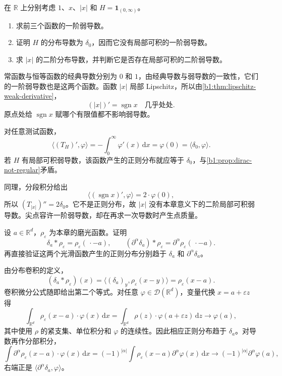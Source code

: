 \begin{exercise}\label{b1:ex:20-basic-weak-derivatives}
在 \(\mathbb R\) 上分别考虑 \(1\)、\(x\)、\(|x|\) 和 \(H=\mathbf1_{(0,\infty)}\)。
\begin{enumerate}
\item 求前三个函数的一阶弱导数。
\item 证明 \(H\) 的分布导数为 \(\delta_0\)，因而它没有局部可积的一阶弱导数。
\item 求 \(|x|\) 的二阶分布导数，并判断它是否存在局部可积的二阶弱导数。
\end{enumerate}
\end{exercise}
\begin{solution}
常函数与恒等函数的经典导数分别为 \(0\) 和 \(1\)，由经典导数与弱导数的一致性，它们的一阶弱导数也是这两个函数。函数 \(|x|\) 局部 Lipschitz，所以由\cref{b1:thm:lipschitz-weak-derivative}，
\[
 (|x|)'=\operatorname{sgn}x
 \quad\text{几乎处处}.
\]
原点处给 \(\operatorname{sgn}x\) 赋哪个有限值都不影响弱导数。

对任意测试函数，
\[
 \langle(T_H)',\varphi\rangle
 =-\int_0^\infty\varphi'(x)\,\mathrm dx
 =\varphi(0)=\langle\delta_0,\varphi\rangle.
\]
若 \(H\) 有局部可积弱导数，该函数产生的正则分布就应等于 \(\delta_0\)，与\cref{b1:prop:dirac-not-regular}矛盾。

同理，分段积分给出
\[
 \langle(\operatorname{sgn}x)',\varphi\rangle=2\cdot \varphi(0),
\]
所以 \((T_{|x|})''=2\delta_0\)。它不是正则分布，故 \(|x|\) 没有本章意义下的二阶局部可积弱导数。尖点容许一阶弱导数，却在再求一次导数时产生点质量。
\end{solution}

\begin{exercise}\label{b1:ex:20-dirac-mollification}
设 \(a\in\mathbb R^d\)，\(\rho_\varepsilon\) 为本章的磨光函数。证明
\[
 \delta_a*\rho_\varepsilon=\rho_\varepsilon(\,\cdot-a),
 \qquad
 (\partial^\alpha\delta_a)*\rho_\varepsilon
 =\partial^\alpha\rho_\varepsilon(\,\cdot-a).
\]
再直接验证这两个光滑函数产生的正则分布分别趋于 \(\delta_a\) 和 \(\partial^\alpha\delta_a\)。
\end{exercise}
\begin{solution}
由分布卷积的定义，
\[
 (\delta_a*\rho_\varepsilon)(x)
 =\langle(\delta_a)_y,\rho_\varepsilon(x-y)\rangle
 =\rho_\varepsilon(x-a).
\]
卷积微分公式随即给出第二个等式。对任意 \(\varphi\in\mathcal D(\mathbb R^d)\)，变量代换 \(x=a+\varepsilon z\) 得
\[
 \int_{\mathbb R^d}\rho_\varepsilon(x-a)\cdot\varphi(x)\,\mathrm dx
 =\int_{\mathbb R^d}\rho(z)\cdot\varphi(a+\varepsilon z)\,\mathrm dz
 \longrightarrow\varphi(a),
\]
其中使用 \(\rho\) 的紧支集、单位积分和 \(\varphi\) 的连续性。因此相应正则分布趋于 \(\delta_a\)。对导数再作分部积分，
\[
 \int\partial^\alpha\rho_\varepsilon(x-a)\cdot\varphi(x)\,\mathrm dx
 =(-1)^{|\alpha|}\int\rho_\varepsilon(x-a)\partial^\alpha\varphi(x)\,\mathrm dx
 \longrightarrow(-1)^{|\alpha|}\partial^\alpha\varphi(a),
\]
右端正是 \(\langle\partial^\alpha\delta_a,\varphi\rangle\)。
\end{solution}

